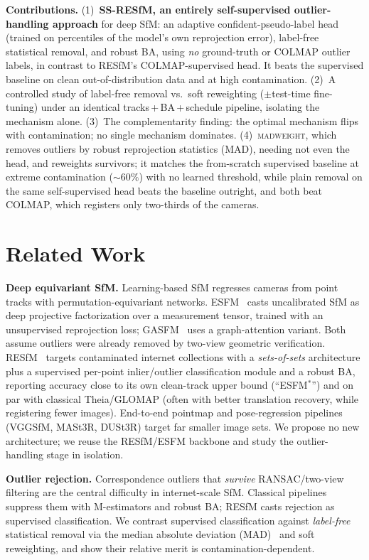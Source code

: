 \documentclass[10pt,twocolumn,letterpaper]{article}
\newcommand{\mad}{\textsc{madweight}}
\begin{document}
\noindent\textbf{Contributions.}
(1)~\textbf{SS-RESfM, an entirely self-supervised outlier-handling approach} for deep SfM: an
adaptive confident-pseudo-label head (trained on percentiles of the model's own reprojection
error), label-free statistical removal, and robust BA, using \emph{no} ground-truth or
COLMAP outlier labels, in contrast to RESfM's COLMAP-supervised head. It beats the
supervised baseline on clean out-of-distribution data and at high contamination.
(2)~A controlled study of label-free removal vs.\ soft reweighting
($\pm$test-time fine-tuning) under an identical tracks\,+\,BA\,+\,schedule pipeline,
isolating the mechanism alone.
(3)~The complementarity finding: the optimal mechanism flips with contamination; no single
mechanism dominates.
(4)~\mad{}, which removes outliers by robust reprojection statistics (MAD), needing not
even the head, and reweights survivors; it matches the from-scratch supervised baseline at
extreme contamination ($\sim\!60\%$) with no learned threshold, while plain removal on
the same self-supervised head beats the baseline outright, and both beat COLMAP, which
registers only two-thirds of the cameras.

\section{Related Work}
\textbf{Deep equivariant SfM.} Learning-based SfM regresses cameras from point tracks with
permutation-equivariant networks. ESFM~\cite{esfm} casts uncalibrated SfM as deep projective
factorization over a measurement tensor, trained with an unsupervised reprojection loss;
GASFM~\cite{gasfm} uses a graph-attention variant. Both assume outliers were already removed
by two-view geometric verification. RESfM~\cite{resfm} targets contaminated internet
collections with a \emph{sets-of-sets} architecture plus a supervised per-point
inlier/outlier classification module and a robust BA, reporting accuracy close to its own
clean-track upper bound (``ESFM$^\ast$'') and on par with classical Theia/GLOMAP
(often with better translation recovery, while registering fewer images).
End-to-end pointmap and pose-regression pipelines (VGGSfM, MASt3R, DUSt3R) target far
smaller image sets. We propose no new architecture; we reuse the RESfM/ESFM backbone and
study the outlier-handling stage in isolation.

\noindent\textbf{Outlier rejection.} Correspondence outliers that \emph{survive}
RANSAC/two-view filtering are the central difficulty in internet-scale SfM. Classical
pipelines suppress them with M-estimators and robust BA; RESfM casts rejection as
supervised classification. We contrast supervised classification against \emph{label-free}
statistical removal via the median absolute deviation (MAD)~\cite{mad} and soft
reweighting, and show their relative merit is contamination-dependent.
\end{document}
